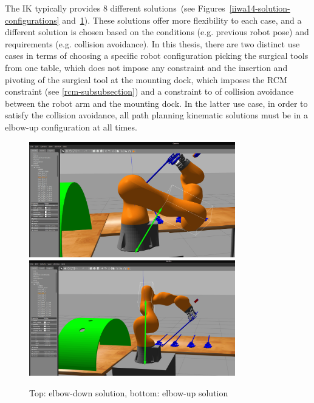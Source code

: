 The IK typically provides 8 different solutions~(see Figures~\ref{iiwa14-solution-configurations} and~\ref{elbow-up-vs-down}). These solutions offer more flexibility to each case, and a different solution is chosen based on the conditions (e.g. previous robot pose) and requirements (e.g. collision avoidance). In this thesis, there are two distinct use cases in terms of choosing a specific robot configuration picking the surgical tools from one table, which does not impose any constraint and the insertion and pivoting of the surgical tool at the mounting dock, which imposes the RCM constraint (see \ref{rcm-subsubsection}) and a constraint to of collision avoidance between the robot arm and the mounting dock.
In the latter use case, in order to satisfy the collision avoidance, all path planning kinematic solutions must be in a elbow-up configuration at all times.

\begin{center}
\begin{figure}[htbp]
\centering
\includegraphics[width=0.8\textwidth]{images/elbow-down.png}\\
\includegraphics[width=0.8\textwidth]{images/elbow-up.png}\\
\caption{Top: elbow-down solution, bottom: elbow-up solution}
\label{elbow-up-vs-down}
\end{figure}
\end{center}

